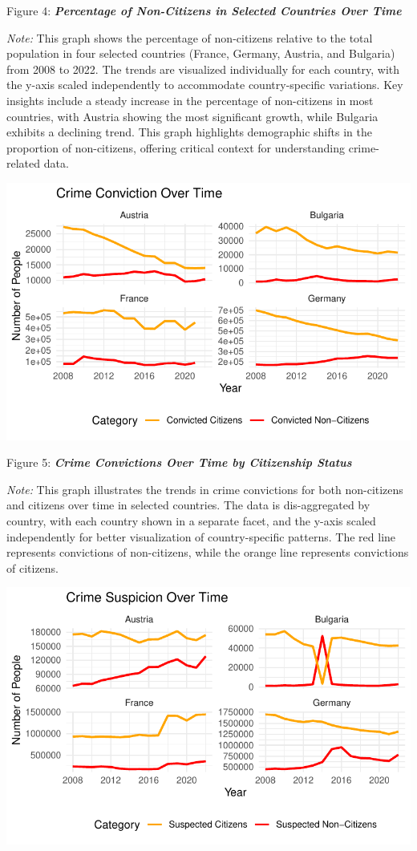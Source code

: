 \documentclass[
]{article}
\begin{document}
Figure 4: \textbf{\emph{Percentage of Non-Citizens in Selected Countries
Over Time}}

\emph{Note:} This graph shows the percentage of non-citizens relative to
the total population in four selected countries (France, Germany,
Austria, and Bulgaria) from 2008 to 2022. The trends are visualized
individually for each country, with the y-axis scaled independently to
accommodate country-specific variations. Key insights include a steady
increase in the percentage of non-citizens in most countries, with
Austria showing the most significant growth, while Bulgaria exhibits a
declining trend. This graph highlights demographic shifts in the
proportion of non-citizens, offering critical context for understanding
crime-related data.

\includegraphics{DataMan_Project_files/figure-pdf/unnamed-chunk-29-1.pdf}

Figure 5: \textbf{\emph{Crime Convictions Over Time by Citizenship
Status}}

\emph{Note:} This graph illustrates the trends in crime convictions for
both non-citizens and citizens over time in selected countries. The data
is dis-aggregated by country, with each country shown in a separate
facet, and the y-axis scaled independently for better visualization of
country-specific patterns. The red line represents convictions of
non-citizens, while the orange line represents convictions of citizens.

\includegraphics{DataMan_Project_files/figure-pdf/unnamed-chunk-30-1.pdf}
\end{document}
